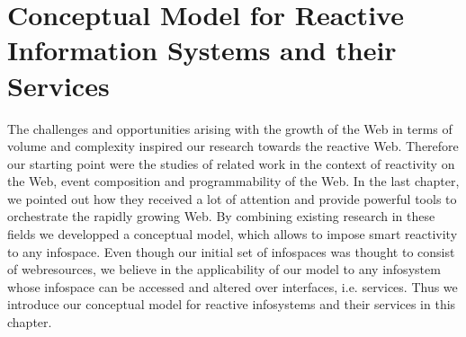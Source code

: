 



\chapter{Conceptual Model for Reactive Information Systems and their Services}
The challenges and opportunities arising with the growth of the Web in terms of volume and complexity inspired our research towards the reactive Web.
Therefore our starting point were the studies of related work in the context of reactivity on the Web, event composition and programmability of the Web.
In the last chapter, we pointed out how they received a lot of attention and provide powerful tools to orchestrate the rapidly growing Web.
By combining existing research in these fields we developped a conceptual model, which allows to impose smart reactivity to any \textrm{\gls{infospace}}.
Even though our initial set of \textrm{\glspl{infospace}} was thought to consist of \textrm{\glspl{webresource}}, we believe in the applicability of our model to any \textrm{\gls{infosystem}} whose \textrm{\gls{infospace}} can be accessed and altered over interfaces, i.e. services.
Thus we introduce our conceptual model for reactive \textrm{\glspl{infosystem}} and their services in this chapter.

